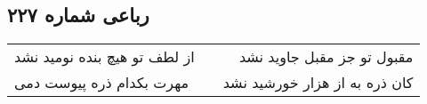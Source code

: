 \begin{center}
\section*{رباعی شماره ۲۲۷}
\label{sec:sh227}
\begin{longtable}{l p{0.5cm} r}
از لطف تو هیچ بنده نومید نشد
&&
مقبول تو جز مقبل جاوید نشد
\\
مهرت بکدام ذره پیوست دمی
&&
کان ذره به از هزار خورشید نشد
\\
\end{longtable}
\end{center}
